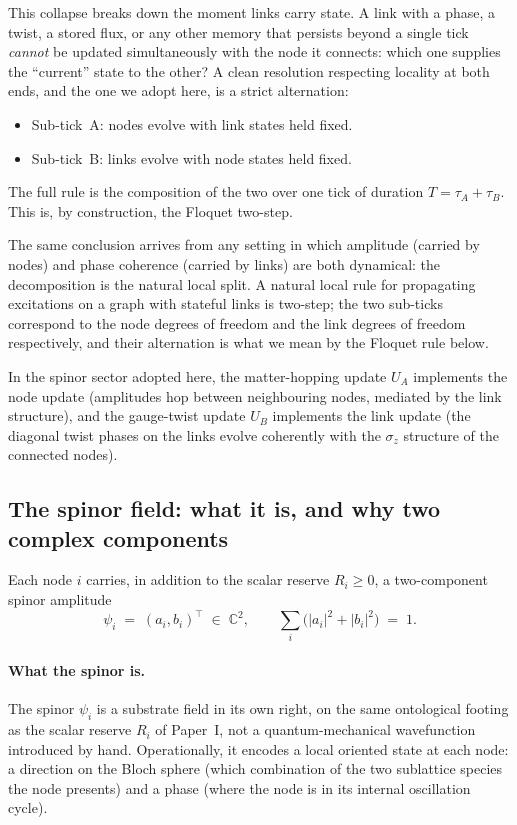 \documentclass[11pt,a4paper]{article}
\begin{document}
This collapse breaks down the moment links carry state. A
link with a phase, a twist, a stored flux, or any other memory
that persists beyond a single tick \emph{cannot} be updated
simultaneously with the node it connects: which one supplies
the ``current'' state to the other? A clean resolution respecting locality at both ends, and the
one we adopt here, is a strict alternation:
\begin{itemize}
\item Sub-tick~A: nodes evolve with link states held fixed.
\item Sub-tick~B: links evolve with node states held fixed.
\end{itemize}
The full rule is the composition of the two over one tick of
duration $T = \tau_A + \tau_B$. This is, by construction, the
Floquet two-step.

The same conclusion arrives from any setting in which
amplitude (carried by nodes) and phase coherence (carried by
links) are both dynamical: the decomposition is the natural local split. A natural local rule for propagating excitations on a graph
with stateful links is two-step; the two sub-ticks
correspond to the node degrees of freedom and the link degrees
of freedom respectively, and their alternation is what we
mean by the Floquet rule below.

In the spinor sector adopted here, the matter-hopping update
$U_A$ implements the node update (amplitudes hop between
neighbouring nodes, mediated by the link structure), and the
gauge-twist update $U_B$ implements the link update (the
diagonal twist phases on the links evolve coherently with the
$\sigma_z$ structure of the connected nodes).

\subsection{The spinor field: what it is, and why two complex components}
\label{sec:spinor}

Each node $i$ carries, in addition to the scalar reserve
$R_i \ge 0$, a two-component spinor amplitude
\begin{equation}
\psi_i \;=\; (a_i, b_i)^\top \;\in\; \mathbb{C}^2,
\qquad
\sum_i \big( |a_i|^2 + |b_i|^2 \big) \;=\; 1.
\label{eq:spinor_def}
\end{equation}

\paragraph{What the spinor is.}
The spinor $\psi_i$ is a substrate field in its own right, on
the same ontological footing as the scalar reserve $R_i$ of
Paper~I, not a quantum-mechanical wavefunction introduced by
hand. Operationally, it encodes a local oriented state at each
node: a direction on the Bloch sphere (which combination of the
two sublattice species the node presents) and a phase (where
the node is in its internal oscillation cycle).
\end{document}
